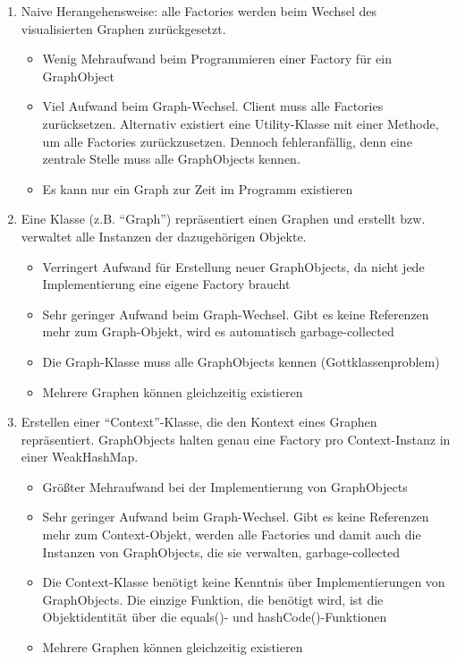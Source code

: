 \documentclass[accentcolor=tud0b,12pt,paper=a4]{tudreport}
\begin{document}
			\begin{enumerate}
				\item Naive Herangehensweise: alle Factories werden beim Wechsel des visualisierten Graphen zurückgesetzt.
				\begin{itemize}
					\item Wenig Mehraufwand beim Programmieren einer Factory für ein GraphObject
					\item Viel Aufwand beim Graph-Wechsel. Client muss alle Factories zurücksetzen. Alternativ existiert eine Utility-Klasse mit einer Methode, um alle Factories zurückzusetzen. Dennoch fehleranfällig, denn eine zentrale Stelle muss alle GraphObjects kennen.
					\item Es kann nur ein Graph zur Zeit im Programm existieren
				\end{itemize}
				\item Eine Klasse (z.B. "`Graph"') repräsentiert einen Graphen und erstellt bzw. verwaltet alle Instanzen der dazugehörigen Objekte.
				\begin{itemize}
					\item Verringert Aufwand für Erstellung neuer GraphObjects, da nicht jede Implementierung eine eigene Factory braucht
					\item Sehr geringer Aufwand beim Graph-Wechsel. Gibt es keine Referenzen mehr zum Graph-Objekt, wird es automatisch garbage-collected
					\item Die Graph-Klasse muss alle GraphObjects kennen (Gottklassenproblem) 
					\item Mehrere Graphen können gleichzeitig existieren
				\end{itemize}
				\item Erstellen einer "`Context"'-Klasse, die den Kontext eines Graphen repräsentiert. GraphObjects halten genau eine Factory pro Context-Instanz in einer WeakHashMap.
				\begin{itemize}
					\item Größter Mehraufwand bei der Implementierung von GraphObjects
					\item Sehr geringer Aufwand beim Graph-Wechsel. Gibt es keine Referenzen mehr zum Context-Objekt, werden alle Factories und damit auch die Instanzen von GraphObjects, die sie verwalten, garbage-collected
					\item Die Context-Klasse benötigt keine Kenntnis über Implementierungen von GraphObjects. Die einzige Funktion, die benötigt wird, ist die Objektidentität über die equals()- und hashCode()-Funktionen
					\item Mehrere Graphen können gleichzeitig existieren
				\end{itemize}
			\end{enumerate}
			
\end{document}
